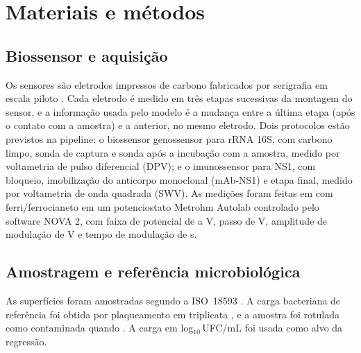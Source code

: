 \section{Materiais e métodos}

\subsection{Biossensor e aquisição}
Os sensores são eletrodos impressos de carbono fabricados por serigrafia em escala piloto
. Cada
eletrodo é medido em três etapas sucessivas da montagem do sensor, e a informação usada pelo modelo
é a mudança entre a última etapa (após o contato com a amostra) e a anterior, no mesmo eletrodo.
Dois protocolos estão previstos na pipeline: o biossensor genossensor para rRNA 16S, com carbono
limpo, sonda de captura e sonda após a incubação com a amostra, medido por voltametria de pulso
diferencial (DPV); e o imunossensor para NS1, com bloqueio, imobilização do anticorpo monoclonal
(mAb-NS1) e etapa final, medido por voltametria de onda quadrada (SWV). 
As medições foram feitas em  com
ferri/ferrocianeto  em um potenciostato Metrohm Autolab controlado pelo
software NOVA 2, com faixa de potencial de  a  V, passo de
 V, amplitude de modulação de  V e tempo de modulação de
 s.

\subsection{Amostragem e referência microbiológica}
As superfícies foram amostradas segundo a ISO~18593 \citep{iso18593} . A carga bacteriana de
referência foi obtida por plaqueamento em triplicata , e a
amostra foi rotulada como contaminada quando . A carga em
log$_{10}$\,UFC/mL foi usada como alvo da regressão.

